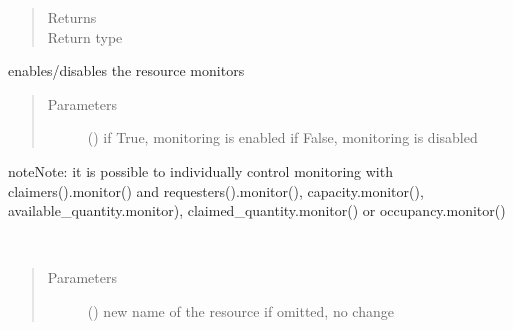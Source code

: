\documentclass[letterpaper,10pt,english]{sphinxmanual}
\begin{document}
\begin{fulllineitems}
\begin{fulllineitems}
\begin{quote}
\begin{description}
\item[{Returns}] \leavevmode
{}

\item[{Return type}] \leavevmode
{\hyperref[\detokenize{Reference:salabim.Resource}]{}}

\end{description}\end{quote}

\end{fulllineitems}


\begin{fulllineitems}
\label{\detokenize{Reference:salabim.Resource.monitor}}
enables/disables the resource monitors
\begin{quote}\begin{description}
\item[{Parameters}] \leavevmode
{} () \textendash{} if True, monitoring is enabled 
if False, monitoring is disabled 

\end{description}\end{quote}

\begin{sphinxadmonition}{note}{Note:}
it is possible to individually control monitoring with claimers().monitor()
and requesters().monitor(), capacity.monitor(), available\_quantity.monitor),
claimed\_quantity.monitor() or occupancy.monitor()
\end{sphinxadmonition}

\end{fulllineitems}


\begin{fulllineitems}
\label{\detokenize{Reference:salabim.Resource.name}}~\begin{quote}\begin{description}
\item[{Parameters}] \leavevmode
{} () \textendash{} new name of the resource
if omitted, no change


\end{description}
\end{quote}
\end{fulllineitems}
\end{fulllineitems}
\end{document}

